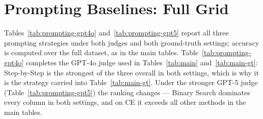 \section{Prompting Baselines: Full Grid}
\label{app:prompting-gpt5}

Tables~\ref{tab:prompting-gpt4o} and~\ref{tab:prompting-gpt5} report all three
prompting strategies under both judges and both ground-truth settings; accuracy is
computed over the full dataset, as in the main tables. Table~\ref{tab:prompting-gpt4o}
completes the GPT-4o judge used in Tables~\ref{tab:main} and~\ref{tab:main-gt}:
Step-by-Step is the strongest of the three overall in both settings, which is why it
is the strategy carried into Table~\ref{tab:main-gt}. Under the stronger GPT-5 judge
(Table~\ref{tab:prompting-gpt5}) the ranking changes --- Binary Search dominates
every column in both settings, and on CE it exceeds all other methods in the main
tables.

